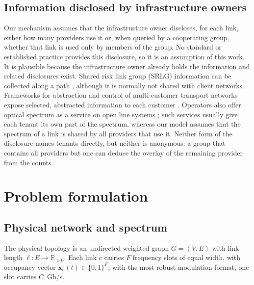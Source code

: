 \documentclass[11pt,a4paper]{article}
\theoremstyle{definition}
\begin{document}
\subsection{Information disclosed by infrastructure owners}

Our mechanism assumes that the infrastructure owner discloses, for each link, either how many providers use it or, when queried by a cooperating group, whether that link is used only by members of the group.
No standard or established practice provides this disclosure, so it is an assumption of this work.
It is plausible because the infrastructure owner already holds the information and related disclosures exist.
Shared risk link group (SRLG) information can be collected along a path \cite{rfc8001}, although it is normally not shared with client networks.
Frameworks for abstraction and control of multi-customer transport networks expose selected, abstracted information to each customer \cite{rfc8453}.
Operators also offer optical spectrum as a service on open line systems \cite{kaeval2022osaas}; such services usually give each tenant its own part of the spectrum, whereas our model assumes that the spectrum of a link is shared by all providers that use it.
Neither form of the disclosure names tenants directly, but neither is anonymous: a group that contains all providers but one can deduce the overlay of the remaining provider from the counts.

\section{Problem formulation}
\label{sec:problem}

\subsection{Physical network and spectrum}

The physical topology is an undirected weighted graph $G=(V,E)$ with link length $\ell:E\to\mathbb{R}_{>0}$.
Each link $e$ carries $F$ frequency slots of equal width, with occupancy vector $\mathbf{x}_e(t)\in\{0,1\}^F$; with the most robust modulation format, one slot carries $C$~Gb/s.
\end{document}
